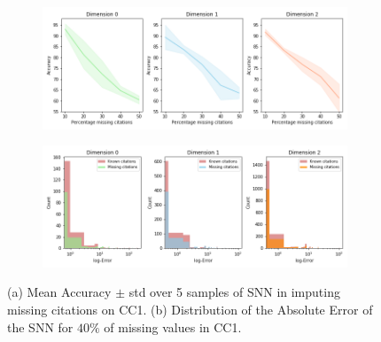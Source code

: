 \begin{figure}[tb]
\centering
 \begin{subfigure}[t]{-0.8\textwidth}
 \vspace{-4cm}
  \end{subfigure}
\begin{subfigure}[t]{0.8\textwidth}
\centering
   \includegraphics[scale=0.35]{./figures/accuracy_network1.png}
\end{subfigure}
 \begin{subfigure}[t]{0.8\textwidth}
  \end{subfigure}
\begin{subfigure}[t]{0.8\textwidth}
\centering
\vspace{-0.5cm}
   \includegraphics[scale=0.36]{./figures/Error_dist_start150250_seed6666_notsee40.png}
\end{subfigure}
\caption{(a) Mean Accuracy $\pm$ std over 5 samples of SNN in imputing missing citations on CC1. (b) Distribution of the Absolute Error of the SNN for $40\%$ of missing values in CC1.   }
\label{fig:accuracy-error}
\end{figure}